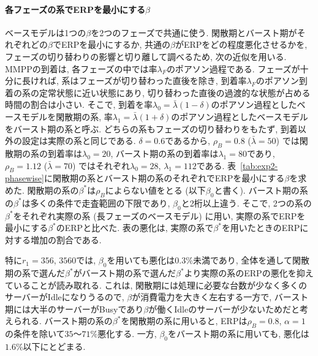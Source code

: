 \documentclass[a4paper, 11pt, dvipdfmx]{jsreport}
\begin{document}
\paragraph{各フェーズの系でERPを最小にする$\beta$}
ベースモデルは1つの$\beta$を2つのフェーズで共通に使う. 閑散期とバースト期がそれぞれどの$\beta$でERPを最小にするか,
共通の$\beta$がERPをどの程度悪化させるかを, フェーズの切り替わりの影響と切り離して調べるため, 次の近似を用いる.
MMPPの到着は, 各フェーズの中では率$\lambda_F$のポアソン過程である. フェーズが十分に長ければ, 系はフェーズが切り替わった直後を除き,
到着率$\lambda_F$のポアソン到着の系の定常状態に近い状態にあり, 切り替わった直後の過渡的な状態が占める時間の割合は小さい.
そこで, 到着を率$\lambda_0 = \bar{\lambda}(1-\delta)$のポアソン過程としたベースモデルを閑散期の系,
率$\lambda_1 = \bar{\lambda}(1+\delta)$のポアソン過程としたベースモデルをバースト期の系と呼ぶ.
どちらの系もフェーズの切り替わりをもたず, 到着以外の設定は実際の系と同じである.
$\delta = 0.6$であるから, $\rho_B = 0.8$ ($\bar{\lambda} = 50$) では閑散期の系の到着率は$\lambda_0 = 20$, バースト期の系の到着率は$\lambda_1 = 80$であり,
$\rho_B = 1.12$ ($\bar{\lambda} = 70$) ではそれぞれ$\lambda_0 = 28$, $\lambda_1 = 112$である.
表~\ref{tab:exp2-phasewise}に閑散期の系とバースト期の系のそれぞれでERPを最小にする$\beta$を求めた.
閑散期の系の$\beta^*$は$\rho_B$によらない値をとる (以下$\beta_0$と書く). バースト期の系の$\beta^*$は多くの条件で走査範囲の下限であり,
$\beta_0$と2桁以上違う. そこで, 2つの系の$\beta^*$をそれぞれ実際の系 (長フェーズのベースモデル) に用い,
実際の系でERPを最小にする$\beta^*$のERPと比べた. 表の悪化は, 実際の系で$\beta^*$を用いたときのERPに対する増加の割合である.

特に$r_1 = 356$, $3560$では, $\beta_0$を用いても悪化は$0.3\%$未満であり, 全体を通して閑散期の系で選んだ$\beta^*$がバースト期の系で選んだ$\beta^*$より実際の系のERPの悪化を抑えていることが読み取れる.
これは, 閑散期には処理に必要な台数が少なく多くのサーバーがIdleになりうるので, $\beta$が消費電力を大きく左右する一方で, バースト期には大半のサーバーがBusyであり$\beta$が働くIdleのサーバーが少ないためだと考えられる.
バースト期の系の$\beta^*$を閑散期の系に用いると, ERPは$\rho_B = 0.8$, $\alpha = 1$の条件を除いて$35$〜$71\%$悪化する.
一方, $\beta_0$をバースト期の系に用いても, 悪化は$1.6\%$以下にとどまる.
\end{document}
